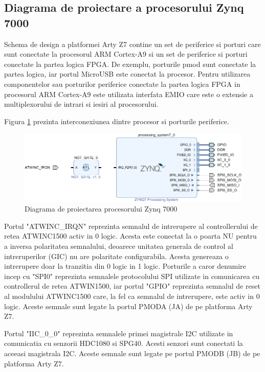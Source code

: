 \subsection{Diagrama de proiectare a procesorului Zynq 7000}\label{subsec:pi_senzor_designzynq}
Schema de design a platformei Arty Z7 contine un set de periferice si porturi care sunt conectate la procesorul ARM Cortex-A9 si un set de periferice si porturi 
conectate la partea logica FPGA. De exemplu, porturile pmod sunt conectate la partea logica, iar portul MicroUSB este conectat la procesor. Pentru utilizarea 
componentelor sau porturilor periferice conectate la partea logica FPGA in procesorul ARM Cortex-A9 este utilizata interfata EMIO care este o extensie a 
multiplexorului de intrari si iesiri al procesorului.

Figura \ref{fig:PI_ZynqBlockDesign} prezinta interconexiunea dintre procesor si porturile periferice.
\begin{figure}[H]
    \centering
    \includegraphics[scale=0.6]{figs/PI_ZynqBlockDesign.png}
    \caption{Diagrama de proiectarea procesorului Zynq 7000}
    \label{fig:PI_ZynqBlockDesign}
\end{figure}

Portul "ATWINC\_IRQN" reprezinta semnalul de intrerupere al controllerului de retea ATWINC1500 activ in 0 logic. Acesta este conectat la o poarta NU pentru a 
inversa polaritatea semnalului, deoarece unitatea generala de control al intreruperilor (GIC) nu are polaritate configurabila. Acesta genereaza o intrerupere 
doar la tranzitia din 0 logic in 1 logic. Porturile a caror denumire incep cu "SPI0" reprezinta semnalele protocolului SPI utilizate in comunicarea cu controllerul 
de retea ATWIN1500, iar portul "GPIO" reprezinta semnalul de reset al modulului ATWINC1500 care, la fel ca semnalul de intrerupere, este activ in 0 logic. Aceste 
semnale sunt legate la portul PMODA (JA) de pe platforma Arty Z7.

Portul "IIC\_0\_0" reprezinta semnalele primei magistrale I2C utilizate in comunicatia cu senzorii HDC1080 si SPG40. Acesti senzori sunt conectati la aceeasi magistrala I2C. 
Aceste semnale sunt legate pe portul PMODB (JB) de pe platforma Arty Z7.

